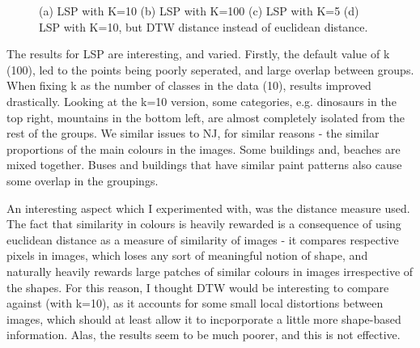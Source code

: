 \documentclass[ 10pt ]{fphw}
\begin{document}
\begin{figure}[H]
{\begin{minipage}[b]{.40\textwidth}
  \end{minipage}}
\usebox{\measurebox}\qquad
\begin{minipage}[b][\ht\measurebox][s]{.55\textwidth}
\centering
{}
\vfill
{}
\end{minipage}
\caption{(a) LSP with K=10 (b) LSP with K=100 (c) LSP with K=5 (d) LSP with K=10, but DTW distance instead of euclidean distance.}
\label{fig:lsp}
\end{figure}

The results for LSP are interesting, and varied. Firstly, the default value of k (100), led to the points being poorly seperated, and large overlap between groups. When fixing k as the number of classes in the data (10), results improved drastically. Looking at the k=10 version, some categories, e.g. dinosaurs in the top right, mountains in the bottom left, are almost completely isolated from the rest of the groups. We similar issues to NJ, for similar reasons - the similar proportions of the main colours in the images. Some buildings and, beaches are mixed together. Buses and buildings that have similar paint patterns also cause some overlap in the groupings.

An interesting aspect which I experimented with, was the distance measure used. The fact that similarity in colours is heavily rewarded is a consequence of using euclidean distance as a measure of similarity of images - it compares respective pixels in images, which loses any sort of meaningful notion of shape, and naturally heavily rewards large patches of similar colours in images irrespective of the shapes. For this reason, I thought DTW would be interesting to compare against (with k=10), as it accounts for some small local distortions between images, which should at least allow it to incporporate a little more shape-based information. Alas, the results seem to be much poorer, and this is not effective.
\end{document}
